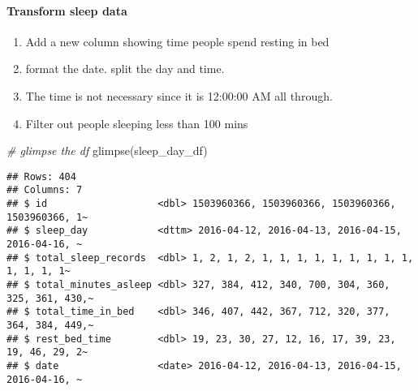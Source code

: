 \documentclass[
]{article}
\newenvironment{Shaded}{\begin{snugshade}}{\end{snugshade}}
\newcommand{\AttributeTok}[1]{\textcolor[rgb]{0.77,0.63,0.00}{#1}}
\newcommand{\CommentTok}[1]{\textcolor[rgb]{0.56,0.35,0.01}{\textit{#1}}}
\newcommand{\DecValTok}[1]{\textcolor[rgb]{0.00,0.00,0.81}{#1}}
\newcommand{\FunctionTok}[1]{\textcolor[rgb]{0.00,0.00,0.00}{#1}}
\newcommand{\NormalTok}[1]{#1}
\newcommand{\OtherTok}[1]{\textcolor[rgb]{0.56,0.35,0.01}{#1}}
\newcommand{\SpecialCharTok}[1]{\textcolor[rgb]{0.00,0.00,0.00}{#1}}
\begin{document}
\hypertarget{transform-sleep-data}{%
\paragraph{Transform sleep data}\label{transform-sleep-data}}

\begin{enumerate}
\def\labelenumi{\arabic{enumi}.}
\item
  Add a new column showing time people spend resting in bed
\item
  format the date. split the day and time.
\item
  The time is not necessary since it is 12:00:00 AM all through.
\item
  Filter out people sleeping less than 100 mins
\end{enumerate}

\begin{Shaded}
\end{Shaded}

\begin{Shaded}
\begin{Highlighting}[]
\CommentTok{\# glimpse the df}
\FunctionTok{glimpse}\NormalTok{(sleep\_day\_df)}
\end{Highlighting}
\end{Shaded}

\begin{verbatim}
## Rows: 404
## Columns: 7
## $ id                   <dbl> 1503960366, 1503960366, 1503960366, 1503960366, 1~
## $ sleep_day            <dttm> 2016-04-12, 2016-04-13, 2016-04-15, 2016-04-16, ~
## $ total_sleep_records  <dbl> 1, 2, 1, 2, 1, 1, 1, 1, 1, 1, 1, 1, 1, 1, 1, 1, 1~
## $ total_minutes_asleep <dbl> 327, 384, 412, 340, 700, 304, 360, 325, 361, 430,~
## $ total_time_in_bed    <dbl> 346, 407, 442, 367, 712, 320, 377, 364, 384, 449,~
## $ rest_bed_time        <dbl> 19, 23, 30, 27, 12, 16, 17, 39, 23, 19, 46, 29, 2~
## $ date                 <date> 2016-04-12, 2016-04-13, 2016-04-15, 2016-04-16, ~
\end{verbatim}
\end{document}
